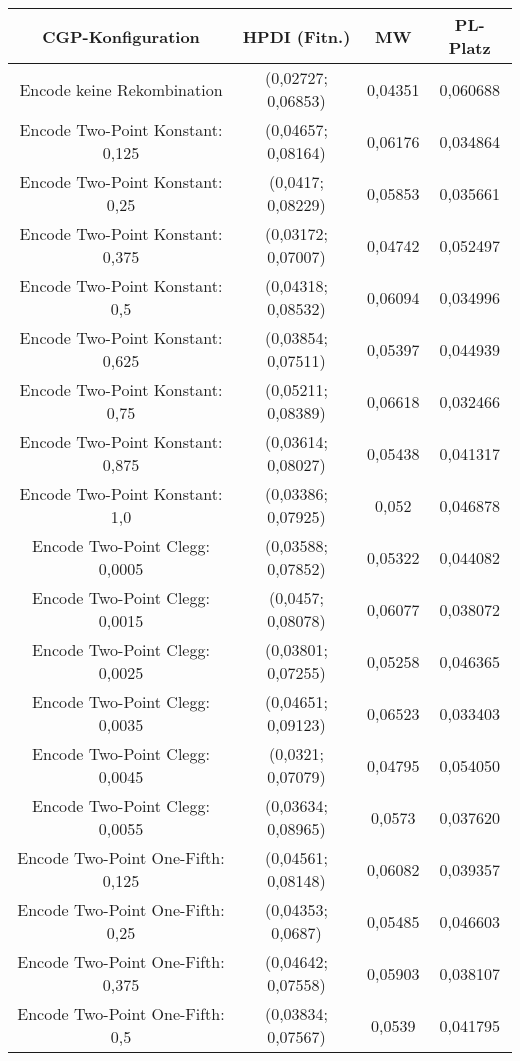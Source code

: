 \begin{table}[H]
	\centering
	\begin{tabular}{c | c | c | c}
		\textbf{CGP-Konfiguration} & \textbf{HPDI (Fitn.)} & \textbf{MW} & \textbf{PL-Platz}\\
		\hline
		Encode keine Rekombination & (0,02727; 0,06853) & 0,04351 & 0,060688\\
		\hline
		Encode Two-Point Konstant: 0,125 & (0,04657; 0,08164) & 0,06176 & 0,034864\\
		\hline
		Encode Two-Point Konstant: 0,25 & (0,0417; 0,08229) & 0,05853 & 0,035661\\
		\hline
		Encode Two-Point Konstant: 0,375 & (0,03172; 0,07007) & 0,04742 & 0,052497\\
		\hline
		Encode Two-Point Konstant: 0,5 & (0,04318; 0,08532) & 0,06094 & 0,034996\\
		\hline
		Encode Two-Point Konstant: 0,625 & (0,03854; 0,07511) & 0,05397 & 0,044939\\
		\hline
		Encode Two-Point Konstant: 0,75 & (0,05211; 0,08389) & 0,06618 & 0,032466\\
		\hline
		Encode Two-Point Konstant: 0,875 & (0,03614; 0,08027) & 0,05438 & 0,041317\\
		\hline
		Encode Two-Point Konstant: 1,0 & (0,03386; 0,07925) & 0,052 & 0,046878\\
		\hline
		Encode Two-Point Clegg: 0,0005 & (0,03588; 0,07852) & 0,05322 & 0,044082\\
		\hline
		Encode Two-Point Clegg: 0,0015 & (0,0457; 0,08078) & 0,06077 & 0,038072\\
		\hline
		Encode Two-Point Clegg: 0,0025 & (0,03801; 0,07255) & 0,05258 & 0,046365\\
		\hline
		Encode Two-Point Clegg: 0,0035 & (0,04651; 0,09123) & 0,06523 & 0,033403\\
		\hline
		Encode Two-Point Clegg: 0,0045 & (0,0321; 0,07079) & 0,04795 & 0,054050\\
		\hline
		Encode Two-Point Clegg: 0,0055 & (0,03634; 0,08965) & 0,0573 & 0,037620\\
		\hline
		Encode Two-Point One-Fifth: 0,125 & (0,04561; 0,08148) & 0,06082 & 0,039357\\
		\hline
		Encode Two-Point One-Fifth: 0,25 & (0,04353; 0,0687) & 0,05485 & 0,046603\\
		\hline
		Encode Two-Point One-Fifth: 0,375 & (0,04642; 0,07558) & 0,05903 & 0,038107\\
		\hline
		Encode Two-Point One-Fifth: 0,5 & (0,03834; 0,07567) & 0,0539 & 0,041795\\

\end{tabular}
\end{table}
